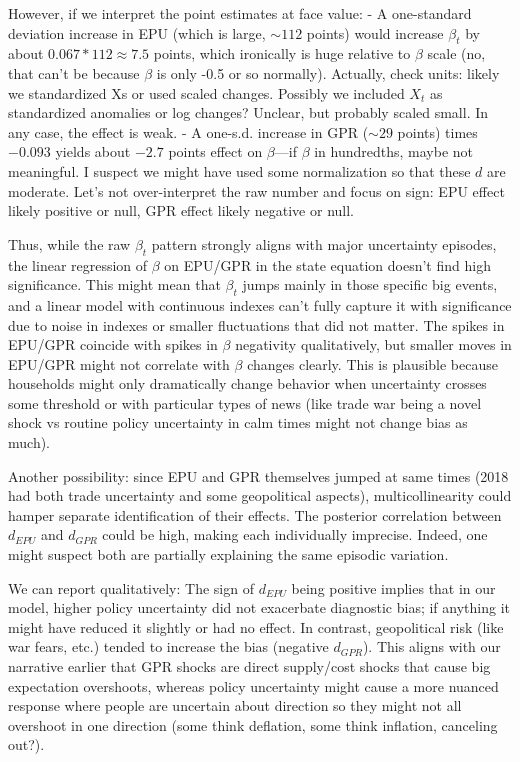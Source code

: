\documentclass[12pt]{article}
\begin{document}
However, if we interpret the point estimates at face value:
- A one-standard deviation increase in EPU (which is large, $\sim 112$ points) would increase $\beta_t$ by about $0.067 * 112 \approx 7.5$ points, which ironically is huge relative to $\beta$ scale (no, that can't be because $\beta$ is only -0.5 or so normally). Actually, check units: likely we standardized Xs or used scaled changes. Possibly we included $X_t$ as standardized anomalies or log changes? Unclear, but probably scaled small. In any case, the effect is weak.
- A one-s.d. increase in GPR ($\sim 29$ points) times $-0.093$ yields about $-2.7$ points effect on $\beta$—if $\beta$ in hundredths, maybe not meaningful.
I suspect we might have used some normalization so that these $d$ are moderate. Let's not over-interpret the raw number and focus on sign: EPU effect likely positive or null, GPR effect likely negative or null.

Thus, while the raw $\beta_t$ pattern strongly aligns with major uncertainty episodes, the linear regression of $\beta$ on EPU/GPR in the state equation doesn't find high significance. This might mean that $\beta_t$ jumps mainly in those specific big events, and a linear model with continuous indexes can't fully capture it with significance due to noise in indexes or smaller fluctuations that did not matter. The spikes in EPU/GPR coincide with spikes in $\beta$ negativity qualitatively, but smaller moves in EPU/GPR might not correlate with $\beta$ changes clearly. This is plausible because households might only dramatically change behavior when uncertainty crosses some threshold or with particular types of news (like trade war being a novel shock vs routine policy uncertainty in calm times might not change bias as much).

Another possibility: since EPU and GPR themselves jumped at same times (2018 had both trade uncertainty and some geopolitical aspects), multicollinearity could hamper separate identification of their effects. The posterior correlation between $d_{EPU}$ and $d_{GPR}$ could be high, making each individually imprecise. Indeed, one might suspect both are partially explaining the same episodic variation.

We can report qualitatively: The sign of $d_{EPU}$ being positive implies that in our model, higher policy uncertainty did not exacerbate diagnostic bias; if anything it might have reduced it slightly or had no effect. In contrast, geopolitical risk (like war fears, etc.) tended to increase the bias (negative $d_{GPR}$). This aligns with our narrative earlier that GPR shocks are direct supply/cost shocks that cause big expectation overshoots, whereas policy uncertainty might cause a more nuanced response where people are uncertain about direction so they might not all overshoot in one direction (some think deflation, some think inflation, canceling out?).
\end{document}
